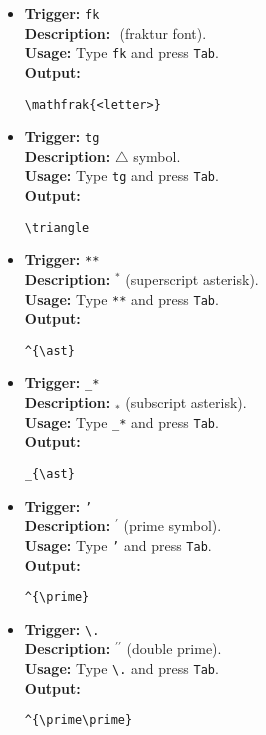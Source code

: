 \documentclass{article}
\begin{document}
\begin{itemize}[leftmargin=*, label={}]
\item \textbf{Trigger:} \texttt{fk} \\
\textbf{Description:} \(\mathfrak{}\) (fraktur font). \\
\textbf{Usage:} Type \texttt{fk} and press \texttt{Tab}. \\
\textbf{Output:}
\begin{verbatim}
\mathfrak{<letter>}
\end{verbatim}

\item \textbf{Trigger:} \texttt{tg} \\
\textbf{Description:} \(\triangle\) symbol. \\
\textbf{Usage:} Type \texttt{tg} and press \texttt{Tab}. \\
\textbf{Output:}
\begin{verbatim}
\triangle
\end{verbatim}

\item \textbf{Trigger:} \texttt{**} \\
\textbf{Description:} \(^{\ast}\) (superscript asterisk). \\
\textbf{Usage:} Type \texttt{**} and press \texttt{Tab}. \\
\textbf{Output:}
\begin{verbatim}
^{\ast}
\end{verbatim}

\item \textbf{Trigger:} \texttt{\_*} \\
\textbf{Description:} \(_{\ast}\) (subscript asterisk). \\
\textbf{Usage:} Type \texttt{\_*} and press \texttt{Tab}. \\
\textbf{Output:}
\begin{verbatim}
_{\ast}
\end{verbatim}

\item \textbf{Trigger:} \texttt{'} \\
\textbf{Description:} \(^{\prime}\) (prime symbol). \\
\textbf{Usage:} Type \texttt{'} and press \texttt{Tab}. \\
\textbf{Output:}
\begin{verbatim}
^{\prime}
\end{verbatim}

\item \textbf{Trigger:} \texttt{\textbackslash .} \\
\textbf{Description:} \(^{\prime\prime}\) (double prime). \\
\textbf{Usage:} Type \texttt{\textbackslash .} and press \texttt{Tab}. \\
\textbf{Output:}
\begin{verbatim}
^{\prime\prime}
\end{verbatim}


\end{itemize}
\end{document}
